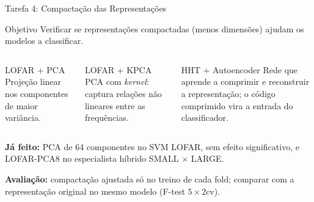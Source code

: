 \documentclass[aspectratio=169]{beamer}
\begin{document}
\begin{frame}{Tarefa 4: Compactação das Representações}
    \footnotesize
    \begin{block}{\small Objetivo}
        \scriptsize
        Verificar se representações compactadas (menos dimensões) ajudam os modelos a classificar.
    \end{block}

    \vspace{0.05cm}
    \begin{columns}[t]
        \begin{block}{\small LOFAR + PCA}
            \scriptsize
            Projeção linear nos componentes de maior variância.
        \end{block}

        \begin{block}{\small LOFAR + KPCA}
            \scriptsize
            PCA com \textit{kernel}: captura relações não lineares entre as frequências.
        \end{block}

        \begin{block}{\small HHT + Autoencoder}
            \scriptsize
            Rede que aprende a comprimir e reconstruir a representação; o código comprimido vira a entrada do classificador.
        \end{block}
    \end{columns}

    \vspace{0.1cm}
    {\scriptsize\textbf{Já feito:} PCA de 64 componentes no SVM LOFAR, sem efeito significativo, e LOFAR-PCA8 no especialista híbrido SMALL $\times$ LARGE.\par}
    {\scriptsize\textbf{Avaliação:} compactação ajustada só no treino de cada fold; comparar com a representação original no mesmo modelo (F-test $5\times2$cv).\par}
\end{frame}
\end{document}

